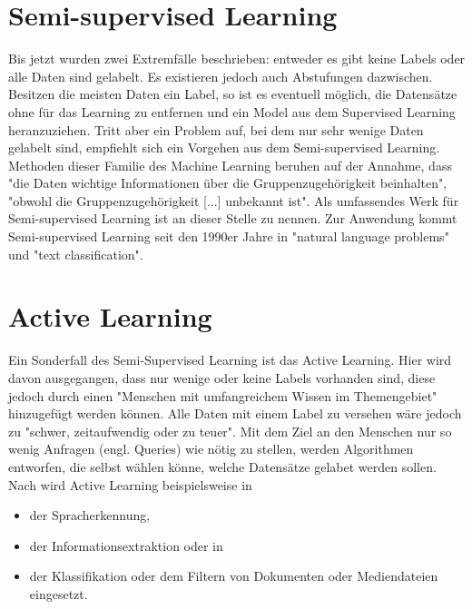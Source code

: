 \section{Semi-supervised Learning}\label{sec:ssl1}
Bis jetzt wurden zwei Extremfälle beschrieben: entweder es gibt keine Labels oder alle Daten sind gelabelt. Es existieren jedoch auch Abstufungen dazwischen. Besitzen die meisten Daten ein Label, so ist es eventuell möglich, die Datensätze ohne für das Learning zu entfernen und ein Model aus dem Supervised Learning heranzuziehen. Tritt aber ein Problem auf, bei dem nur sehr wenige Daten gelabelt sind, empfiehlt sich ein Vorgehen aus dem Semi-supervised Learning. Methoden dieser Familie des Machine Learning beruhen auf der Annahme, dass "die Daten wichtige Informationen über die Gruppenzugehörigkeit beinhalten", "obwohl die Gruppenzugehörigkeit [...] unbekannt ist"\citep[S.~223; eigene Übersetzung]{ramasubramanian_machine_2017}. Als umfassendes Werk für Semi-supervised Learning ist an dieser Stelle \citep{chapelle_semi-supervised_2006} zu nennen. \newline
Zur Anwendung kommt Semi-supervised Learning seit den 1990er Jahre in "natural language problems" und "text classification"\citep[S.~4]{chapelle_semi-supervised_2006}.

\section{Active Learning}\label{sec:al1}
Ein Sonderfall des Semi-Supervised Learning ist das Active Learning. Hier wird davon ausgegangen, dass nur wenige oder keine Labels vorhanden sind, diese jedoch durch einen "Menschen mit umfangreichem Wissen im Themengebiet"\citep[S.~i; eigene Übersetzung]{olsson_literature_2009} hinzugefügt werden können. Alle Daten mit einem Label zu versehen wäre jedoch zu "schwer, zeitaufwendig oder zu teuer"\citep[Abstract; eigene Übersetzung]{settles_active_2010}. Mit dem Ziel an den Menschen nur so wenig Anfragen (engl. Queries) wie nötig zu stellen\citep[Abstract]{olsson_literature_2009}, werden Algorithmen entworfen, die selbst wählen könne, welche Datensätze gelabet werden sollen.\citep[Abstract]{settles_active_2010}\newline
Nach \citep[S.~4]{settles_active_2010} wird Active Learning beispielsweise in
\begin{itemize}
\item der Spracherkennung,
\item der Informationsextraktion oder in
\item der Klassifikation oder dem Filtern von Dokumenten oder Mediendateien eingesetzt.
\end{itemize}

